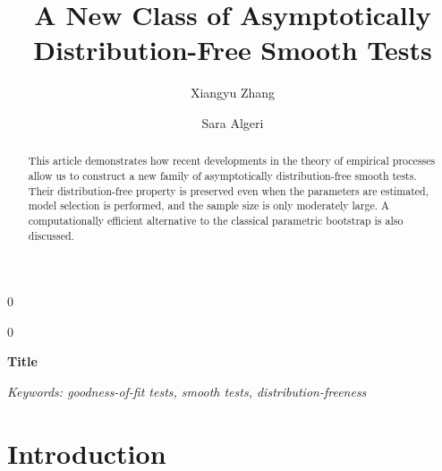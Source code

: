 \documentclass[11pt]{article}
\newcommand{\blind}{0}
\begin{document}
\def\spacingset#1{\renewcommand{\baselinestretch}%
{#1}\small\normalsize} \spacingset{1}



\blind
{
  {\title{\bf A New Class of Asymptotically Distribution-Free Smooth Tests}}
\author[1]{Xiangyu Zhang}
\author[1]{Sara Algeri}
\date{}
  \maketitle
} \fi

\blind
{
  \bigskip
  \bigskip
  \bigskip
  \begin{center}
    {\LARGE\bf Title}
\end{center}
  \medskip
} \fi
\bigskip
\bigskip
\begin{abstract}
This article demonstrates how recent developments in the theory of empirical processes allow us to construct a new family of asymptotically distribution-free smooth tests. Their distribution-free property is preserved even when the parameters are estimated, model selection is performed, and the sample size is only moderately large.  A computationally efficient alternative to the classical parametric bootstrap is also discussed. 
\end{abstract}

\noindent%
{\textit {Keywords: goodness-of-fit tests, smooth tests, distribution-freeness}}
\vfill

\newpage
\spacingset{1.3} %
\section{Introduction} \label{sec:1}
\end{document}
